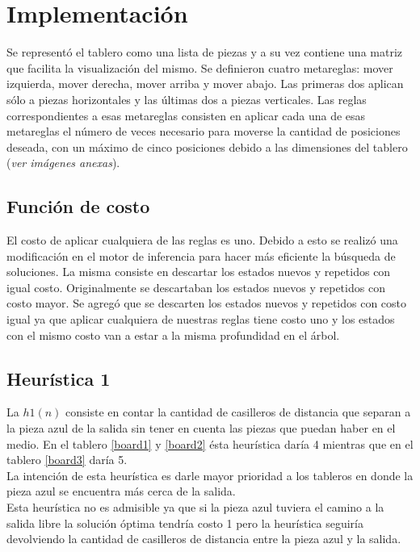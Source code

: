 \documentclass[10pt,journal,compsoc]{IEEEtran}
\begin{document}
\section{Implementaci\'on}
Se represent\'o el tablero como una lista de piezas y a su vez contiene una matriz que facilita la visualizaci\'on del mismo.
Se definieron cuatro metareglas: mover izquierda, mover derecha, mover arriba y mover abajo. Las primeras dos aplican s\'olo a piezas horizontales y las \'ultimas dos a piezas verticales.
Las reglas correspondientes a esas metareglas consisten en aplicar cada una de esas metareglas el n\'umero de veces necesario para moverse la cantidad de posiciones deseada, con un m\'aximo de cinco posiciones debido a las dimensiones del tablero (\textit{ver im\'agenes anexas}).

\subsection{Funci\'on de costo}
El costo de aplicar cualquiera de las reglas es uno.
Debido a esto se realiz\'o una modificaci\'on en el motor de inferencia para hacer m\'as eficiente la b\'usqueda de soluciones. La misma consiste en descartar los estados nuevos y repetidos con igual costo. Originalmente se descartaban los estados nuevos y repetidos con costo mayor. Se agreg\'o que se descarten los estados nuevos y repetidos con costo igual ya que aplicar cualquiera de nuestras reglas tiene costo uno y los estados con el mismo costo van a estar a la misma profundidad en el \'arbol.

\subsection{Heur\'istica 1}
La $h1(n)$ consiste en contar la cantidad de casilleros de distancia que separan a la pieza azul de la salida sin tener en cuenta las piezas que puedan haber en el medio. En el tablero \ref{board1} y \ref{board2} \'esta heur\'istica dar\'ia 4 mientras que en el tablero \ref{board3} dar\'ia 5.\\
 La intenci\'on de esta heur\'istica es darle mayor prioridad a los tableros en donde la pieza azul se encuentra m\'as cerca de la salida.\\
 Esta heur\'istica no es admisible ya que si la pieza azul tuviera el camino a la salida libre la soluci\'on \'optima tendr\'ia costo 1 pero la heur\'istica seguir\'ia devolviendo la cantidad de casilleros de distancia entre la pieza azul y la salida.
\end{document}
